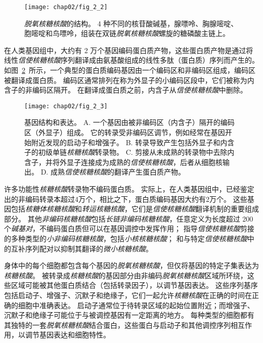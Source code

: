 \begin{figure}[htbp]
	\centering
	\texttt{[image: chap02/fig\_2\_2]}
	\caption{\textit{脱氧核糖核酸}的结构。
		4 种不同的核苷酸碱基，腺嘌呤、胸腺嘧啶、胞嘧啶和鸟嘌呤，组装在双链\textit{脱氧核糖核酸}螺旋的糖磷酸主链上\cite{alberts2017molecular}。}
	\label{fig:2_2}
\end{figure}


在人类基因组中，大约有 2 万个基因编码蛋白质产物，这些蛋白质产物是通过将线性\textit{信使核糖核酸}序列翻译成由氨基酸组成的线性多肽（蛋白质）序列而产生的。
如图~\ref{fig:2_3}~所示，一个典型的蛋白质编码基因由一个编码区和非编码区组成，编码区被翻译成蛋白质。
编码区通常排列在称为外显子的小编码区段中，它们被称为内含子的非编码区隔开。
在翻译成蛋白质之前，内含子从\textit{信使核糖核酸}中删除。



\begin{figure}[htbp]
	\centering
	\texttt{[image: chap02/fig\_2\_3]}
	\caption{基因结构和表达。
		A. 一个基因由被非编码区（内含子）隔开的编码区（外显子）组成。
		它的转录受非编码区调节，例如经常在基因开始附近发现的启动子和增强子。
		B. 转录导致产生包括外显子和内含子的初级单链\textit{核糖核酸}转录物。
		C. 剪接从未成熟的转录物中去除内含子，并将外显子连接成为成熟的\textit{信使核糖核酸}，后者从细胞核输出。
		D. 成熟\textit{信使核糖核酸}的翻译产生蛋白质产物。}
	\label{fig:2_3}
\end{figure}


许多功能性\textit{核糖核酸}转录物不编码蛋白质。 
实际上，在人类基因组中，已经鉴定出的非编码转录本超过4万个，相比之下，蛋白质编码基因大约有2万个。
这些基因包括\textit{核糖体核糖核酸}和\textit{转运核糖核酸}，它们是\textit{信使核糖核酸}翻译机制的重要组成部分。
其他\textit{非编码核糖核酸}包括\textit{长链非编码核糖核酸}，任意定义为长度超过 200 个\textit{碱基对}，不编码蛋白质但可以在基因调控中发挥作用；
指导\textit{信使核糖核酸}剪接的多种类型的\textit{小非编码核糖核酸}，包括\textit{小核核糖核酸}；
和与特定\textit{信使核糖核酸}中的互补序列配对以抑制其翻译的\textit{微小核糖核酸}。



身体中的每个细胞都包含每个基因的\textit{脱氧核糖核酸}，但仅将基因的特定子集表达为\textit{核糖核酸}。
被转录成\textit{核糖核酸}的基因部分由非编码\textit{脱氧核糖核酸}区域所环绕，这些区域可能被其他蛋白质结合（包括转录因子），以调节基因表达。
这些序列基序包括启动子、增强子、沉默子和绝缘子，它们一起允许\textit{核糖核酸}在正确的时间在正确的细胞中准确表达。
启动子通常位于待转录区域的起始位置附近；而增强子、沉默子和绝缘子可能位于与被调控基因有一定距离的地方。
每种类型的细胞都有其独特的一套\textit{脱氧核糖核酸}结合蛋白，这些蛋白与启动子和其他调控序列相互作用，以调节基因表达和细胞特性。




